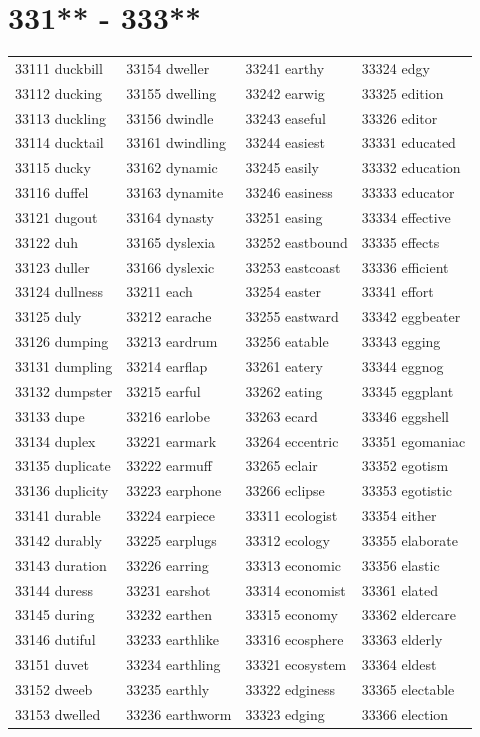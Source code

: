 \documentclass[10pt, oneside]{book}
\begin{document}
\begin{table}
	\centering
	\section*{331** - 333**}
	\begin{tabular}{l l l l}
33111 duckbill &33154 dweller &33241 earthy &33324 edgy\\
33112 ducking &33155 dwelling &33242 earwig &33325 edition\\
33113 duckling &33156 dwindle &33243 easeful &33326 editor\\
33114 ducktail &33161 dwindling &33244 easiest &33331 educated\\
33115 ducky &33162 dynamic &33245 easily &33332 education\\
33116 duffel &33163 dynamite &33246 easiness &33333 educator\\
33121 dugout &33164 dynasty &33251 easing &33334 effective\\
33122 duh &33165 dyslexia &33252 eastbound &33335 effects\\
33123 duller &33166 dyslexic &33253 eastcoast &33336 efficient\\
33124 dullness &33211 each &33254 easter &33341 effort\\
33125 duly &33212 earache &33255 eastward &33342 eggbeater\\
33126 dumping &33213 eardrum &33256 eatable &33343 egging\\
33131 dumpling &33214 earflap &33261 eatery &33344 eggnog\\
33132 dumpster &33215 earful &33262 eating &33345 eggplant\\
33133 dupe &33216 earlobe &33263 ecard &33346 eggshell\\
33134 duplex &33221 earmark &33264 eccentric &33351 egomaniac\\
33135 duplicate &33222 earmuff &33265 eclair &33352 egotism\\
33136 duplicity &33223 earphone &33266 eclipse &33353 egotistic\\
33141 durable &33224 earpiece &33311 ecologist &33354 either\\
33142 durably &33225 earplugs &33312 ecology &33355 elaborate\\
33143 duration &33226 earring &33313 economic &33356 elastic\\
33144 duress &33231 earshot &33314 economist &33361 elated\\
33145 during &33232 earthen &33315 economy &33362 eldercare\\
33146 dutiful &33233 earthlike &33316 ecosphere &33363 elderly\\
33151 duvet &33234 earthling &33321 ecosystem &33364 eldest\\
33152 dweeb &33235 earthly &33322 edginess &33365 electable\\
33153 dwelled &33236 earthworm &33323 edging &33366 election\\
	\end{tabular}
 \end{table}
\clearpage
\end{document}
